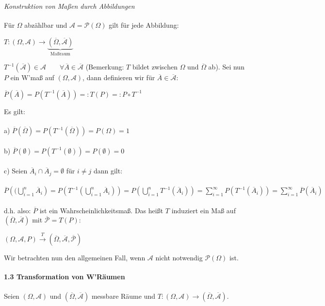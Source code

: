 \documentclass[10pt,a4paper]{report}
\numberwithin{equation}{section}
\numberwithin{figure}{section}
\theoremstyle{plain}
\theoremstyle{definition}
\theoremstyle{plain}
\theoremstyle{definition}
\theoremstyle{remark}
\theoremstyle{plain}
\theoremstyle{plain}
\theoremstyle{plain}
\newcommand{\1}{ \mathbb{1} } %
\begin{document}
\textit{Konstruktion von Maßen durch Abbildungen}\\\\
Für $\Omega$ abzählbar und $\mathcal{A}=\mathcal{P}(\Omega)$ gilt für jede Abbildung:\begin{center}
$T:(\Omega,\mathcal{A}) \to \underbrace{(\overline{\Omega},\overline{\mathcal{A}})}_\text{Maßraum}$
\end{center}
$T^{-1}(\overline{\mathcal{A}})\in \mathcal{A} \qquad \forall \overline{A} \in \overline{\mathcal{A}}$ (Bemerkung: $T$ bildet zwischen $\Omega$ und  $\overline{\Omega}$ ab). Sei nun $P$ ein W'maß auf $(\Omega,\mathcal{A})$, dann definieren wir für $\overline{A} \in \overline{\mathcal{A}}$:
\begin{center}
$\overline{P}(\overline{A})=P(T^{-1}(\overline{A}))=:T(P)=:P\circ T^{-1}$
\end{center}
Es gilt:\\\\
a) $\overline{P}(\overline{\Omega})=P(T^{-1}(\overline{\Omega}))=P(\Omega)=1$\\\\
b) $\overline{P}(\emptyset)=P(T^{-1}(\emptyset))=P(\emptyset)=0$\\\\
c) Seien $\overline{A}_i\cap \overline{A}_j=\emptyset$ für $i\neq j$ dann gilt:\\\\ $\overline{P}\left((\bigcup\limits_{i=1}^n \overline{A}_i \right)=P\left(T^{-1}\left(\bigcup\limits_{i=1}^n \overline{A}_i\right)\right)=P\left(\bigcup\limits_{i=1}^n T^{-1}(\overline{A}_i)\right)=\sum\limits_{i=1}^\infty P(T^{-1}(\overline{A}_i))=\sum\limits_{i=1}^\infty \overline{P}(\overline{A}_i)$\\\\
d.h. also: $\overline{P}$ ist ein Wahrscheinlichkeitsmaß. Das heißt $T$ induziert ein Maß auf $(\overline{\Omega},\overline{\mathcal{A}})$ mit $\overline{\mathcal{P}}=T(P)$:
\begin{center}
$(\Omega, \mathcal{A}, P) \overset{T}{\to}(\overline{\Omega},\overline{\mathcal{A}},\overline{\mathcal{P}})$
\end{center}
Wir betrachten nun den allgemeinen Fall, wenn $\mathcal{A}$ nicht notwendig $\mathcal{P}(\Omega)$ ist.\\\\
\Large{\textbf{1.3 Transformation von W'Räumen}}\normalsize\\\\
Seien $(\Omega, \mathcal{A})$ und $(\overline{\Omega},\overline{\mathcal{A}})$ messbare Räume und $T: (\Omega, \mathcal{A}) \to (\overline{\Omega},\overline{\mathcal{A}})$.\\\\
\end{document}
